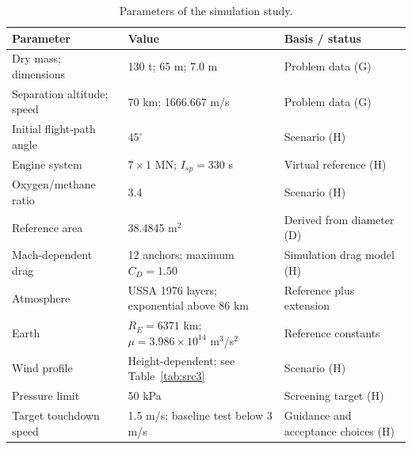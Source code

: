 \begin{table}[htbp]
\caption{Parameters of the simulation study.}
\label{tab:src4}
\small
\setlength{\tabcolsep}{3.5pt}
\begin{tabularx}{\linewidth}{@{}p{.26\linewidth}p{.36\linewidth}X@{}}
\toprule
Parameter & Value & Basis / status \\
\midrule
Dry mass; dimensions & 130 t; 65 m; 7.0 m & Problem data (G) \\
Separation altitude; speed & 70 km; 1666.667 m/s & Problem data (G) \\
Initial flight-path angle & $45^\circ$ & Scenario (H) \\
Engine system & $7\times1$ MN; $I_{sp}=330$ s & Virtual reference (H) \\
Oxygen/methane ratio & 3.4 & Scenario (H) \\
Reference area & 38.4845 m$^2$ & Derived from diameter (D) \\
Mach-dependent drag & 12 anchors; maximum $C_D=1.50$ & Simulation drag model (H) \\
Atmosphere & USSA 1976 layers; exponential above 86 km & Reference plus extension \\
Earth & $R_E=6371$ km; $\mu=3.986\times10^{14}$ m$^3$/s$^2$ & Reference constants \\
Wind profile & Height-dependent; see Table~\ref{tab:src3} & Scenario (H) \\
Pressure limit & 50 kPa & Screening target (H) \\
Target touchdown speed & 1.5 m/s; baseline test below 3 m/s & Guidance and acceptance choices (H) \\
\bottomrule
\end{tabularx}
\end{table}
